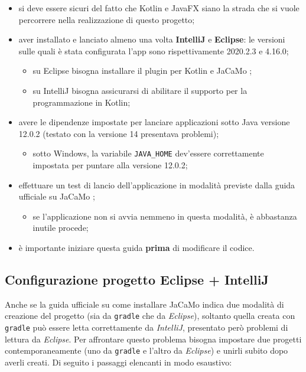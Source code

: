 \documentclass[12pt,a4paper,openright,oneside]{report}
\begin{document}
\begin{itemize}
	\item si deve essere sicuri del fatto che Kotlin e JavaFX siano la strada che si vuole percorrere nella realizzazione di questo progetto;
	
	\item aver installato e lanciato almeno una volta \textbf{IntelliJ} e \textbf{Eclipse}: le versioni sulle quali è stata configurata l'app sono rispettivamente 2020.2.3 e 4.16.0;
	\begin{itemize}
		\item su Eclipse bisogna installare il plugin per Kotlin e JaCaMo \cite{eclipse};
		
		\item su IntelliJ bisogna assicurarsi di abilitare il supporto per la programmazione in Kotlin;
	\end{itemize}

	\item avere le dipendenze impostate per lanciare applicazioni sotto Java versione 12.0.2 (testato con la versione 14 presentava problemi);
	\begin{itemize}
		\item sotto Windows, la variabile \texttt{JAVA\_HOME} dev'essere correttamente impostata per puntare alla versione 12.0.2;
	\end{itemize}

	\item effettuare un test di lancio dell'applicazione in modalità previste dalla guida ufficiale su JaCaMo \cite{jacamo};
	\begin{itemize}
		\item se l'applicazione non si avvia nemmeno in questa modalità, è abbastanza inutile procede;
	\end{itemize}
	
	\item è importante iniziare questa guida \textbf{prima} di modificare il codice.
\end{itemize}

\subsection{Configurazione progetto Eclipse + IntelliJ}
Anche se la guida ufficiale su come installare JaCaMo indica due modalità di creazione del progetto (sia da \texttt{gradle} che da \textit{Eclipse}), soltanto quella creata con \texttt{gradle} può essere letta correttamente da \textit{IntelliJ}, presentato però problemi di lettura da \textit{Eclipse}. Per affrontare questo problema bisogna impostare due progetti contemporaneamente (uno da \texttt{gradle} e l'altro da \textit{Eclipse}) e unirli subito dopo averli creati. Di seguito i passaggi elencanti in modo esaustivo:
\end{document}
